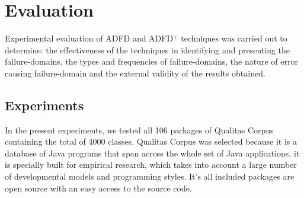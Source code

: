 \begin{enumerate}
%

%
%


\end{enumerate}




\section{Evaluation}
Experimental evaluation of ADFD and ADFD$^+$ techniques was carried out to determine: the effectiveness of the techniques in identifying and presenting the failure-domains, the types and frequencies of failure-domains, the nature of error causing failure-domain and the external validity of the results obtained. 


\subsection{Experiments}
In the present experiments, we tested all 106 packages of Qualitas Corpus containing the total of 4000 classes. Qualitas Corpus was selected because it is a database of Java programs that span across the whole set of Java applications, it is specially built for empirical research, which takes into account a large number of developmental models and programming styles. It's all included packages are open source with an easy access to the source code.

